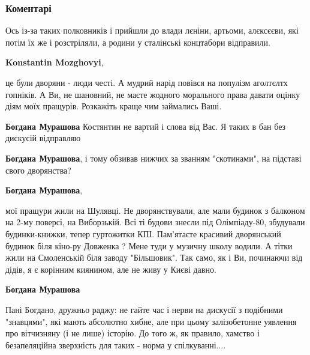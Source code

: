  
 
 
 
 
\subsubsection{Коментарі}

\begin{itemize} %

Ось із-за таких полковників і прийшли до влади лєніни, артьоми, алєксєєви, які
потім їх же і розстріляли, а родини у сталінські концтабори відправили.

\begin{itemize} %
\textbf{Konstantin Mozghovyi}, 

це були дворяни - люди честі. А мудрий нарід повівся на популізм аголтєлтх
гопніків. А Ви, не шановний, не маєте жодного морального права давати оцінку
діям моїх пращурів. Розкажіть краще чим займались Ваші.

\begin{itemize} %
\textbf{Богдана Мурашова} Костянтин не вартий і слова від Вас. Я таких в бан без дискусій відправляю

\textbf{Богдана Мурашова}, і тому обзивав нижчих за званням "скотинами", на підставі свого дворянства?

\textbf{Богдана Мурашова}, 

мої пращури жили на Шулявці. Не дворянствували, але мали будинок з балконом на
2-му поверсі, на Виборзькій. Всі ті будови знесли під Олімпіаду-80, збудували
будинки-книжки, тепер гуртожитки КПІ. Пам'ятаєте красивий дворянський будинок
біля кіно-ру Довженка ? Мене туди у музичну школу водили. А тітки жили на
Смоленській біля заводу "Більшовик". Так само, як і Ви, починаючи від дідів,
я є корінним киянином, але не живу у Києві давно.

\textbf{Богдана Мурашова} 

Пані Богдано, дружньо раджу: не гайте час і нерви на дискусії з подібними
"знавцями", які мають абсолютно хибне, але при цьому залізобетонне уявлення про
вітчизняну (і не лише) історію. До того ж, як правило, хамство і безапеляційна
зверхність для таких - норма у спілкуванні....


\end{itemize}
\end{itemize}
\end{itemize}
